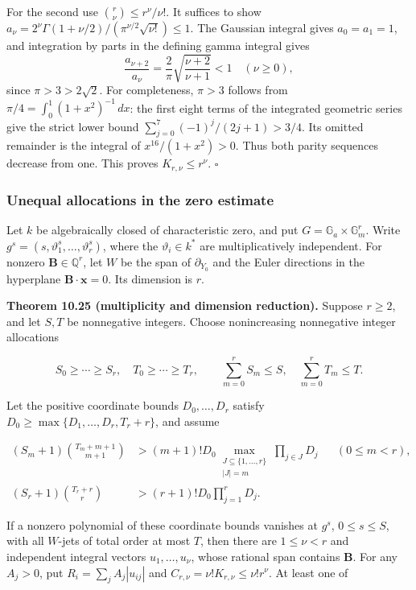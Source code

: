 \documentclass[
  11pt,
  a4paper,
]{article}
\begin{document}
For the second use \(\binom r\nu\le r^\nu/\nu!\). It suffices to show
\(a_\nu=2^\nu\Gamma(1+\nu/2)/(\pi^{\nu/2}\sqrt{\nu!})\le1\). The
Gaussian integral gives \(a_0=a_1=1\), and integration by parts in the
defining gamma integral gives \[
\frac{a_{\nu+2}}{a_\nu}=\frac2\pi
\sqrt{\frac{\nu+2}{\nu+1}}<1\quad(\nu\ge0),
\] since \(\pi>3>2\sqrt2\). For completeness, \(\pi>3\) follows from
\(\pi/4=\int_0^1(1+x^2)^{-1}\,dx\): the first eight terms of the
integrated geometric series give the strict lower bound
\(\sum_{j=0}^7(-1)^j/(2j+1)>3/4\). Its omitted remainder is the integral
of \(x^{16}/(1+x^2)>0\). Thus both parity sequences decrease from one.
This proves \(K_{r,\nu}\le r^\nu\). \(\square\)

\subsubsection{Unequal allocations in the zero
estimate}\label{unequal-allocations-in-the-zero-estimate}

Let \(k\) be algebraically closed of characteristic zero, and put
\(G=\mathbb G_a\times\mathbb G_m^r\). Write
\(g^s=(s,\vartheta_1^s,\ldots,\vartheta_r^s)\), where the
\(\vartheta_i\in k^*\) are multiplicatively independent. For nonzero
\(\boldsymbol B\in\mathbb Q^r\), let \(W\) be the span of
\(\partial_{Y_0}\) and the Euler directions in the hyperplane
\(\boldsymbol B\cdot\boldsymbol x=0\). Its dimension is \(r\).

\textbf{Theorem 10.25 (multiplicity and dimension reduction).} Suppose
\(r\ge2\), and let \(S,T\) be nonnegative integers. Choose nonincreasing
nonnegative integer allocations

\[
S_0\ge\cdots\ge S_r,\quad T_0\ge\cdots\ge T_r,\qquad
\sum_{m=0}^rS_m\le S,\quad\sum_{m=0}^rT_m\le T.
\tag{10.67}
\]

Let the positive coordinate bounds \(D_0,\ldots,D_r\) satisfy
\(D_0\ge\max\{D_1,\ldots,D_r,T_r+r\}\), and assume

\[
\begin{aligned}
(S_m+1)\binom{T_m+m+1}{m+1}
&>(m+1)!D_0
\max_{\substack{J\subseteq\{1,\ldots,r\}\\|J|=m}}
\prod_{j\in J}D_j &&(0\le m<r),\\
(S_r+1)\binom{T_r+r}{r}
&>(r+1)!D_0\prod_{j=1}^rD_j.
\end{aligned}
\tag{10.68}
\]

If a nonzero polynomial of these coordinate bounds vanishes at \(g^s\),
\(0\le s\le S\), with all \(W\)-jets of total order at most \(T\), then
there are \(1\le\nu<r\) and independent integral vectors
\(u_1,\ldots,u_\nu\), whose rational span contains \(\boldsymbol B\).
For any \(A_j>0\), put \(R_i=\sum_jA_j|u_{ij}|\) and
\(C_{r,\nu}=\nu!K_{r,\nu}\le\nu!r^\nu\). At least one of
\end{document}
